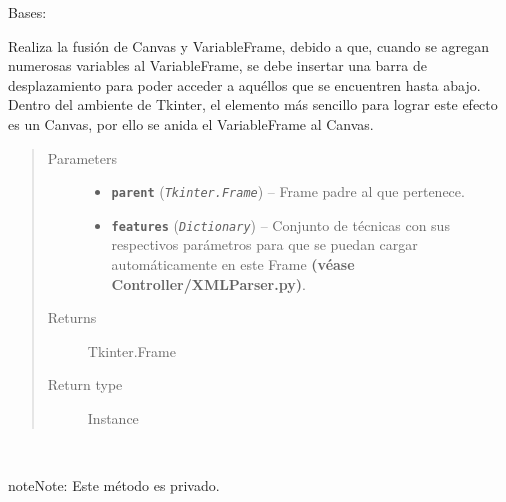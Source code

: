 \documentclass[letterpaper,10pt,english]{sphinxmanual}
\begin{document}
\begin{fulllineitems}
\label{View/Main/DecisionVariable/DecisionVariableFrame:View.Main.DecisionVariable.DecisionVariableFrame.DecisionVariableFrame}
Bases: 

\begin{DUlineblock}{0em}
\item[] Realiza la fusión de Canvas y VariableFrame, debido a que, cuando se agregan 
numerosas variables al VariableFrame, se debe insertar una barra de desplazamiento
para poder acceder a aquéllos que se encuentren hasta abajo. Dentro del ambiente
de Tkinter, el elemento más sencillo para lograr este efecto es un Canvas, por ello 
se anida el VariableFrame al Canvas.
\end{DUlineblock}
\begin{quote}\begin{description}
\item[{Parameters}] \leavevmode\begin{itemize}
\item {} 
\textbf{\texttt{parent}} (\emph{\texttt{Tkinter.Frame}}) -- Frame padre al que pertenece.

\item {} 
\textbf{\texttt{features}} (\emph{\texttt{Dictionary}}) -- Conjunto de técnicas con sus respectivos parámetros para que
se puedan cargar automáticamente en este Frame \textbf{(véase
Controller/XMLParser.py)}.

\end{itemize}

\item[{Returns}] \leavevmode
Tkinter.Frame

\item[{Return type}] \leavevmode
Instance

\end{description}\end{quote}

\begin{fulllineitems}
\label{View/Main/DecisionVariable/DecisionVariableFrame:View.Main.DecisionVariable.DecisionVariableFrame.DecisionVariableFrame._DecisionVariableFrame__activate_scroll}~
\begin{notice}{note}{Note:}
Este método es privado.
\end{notice}


\end{fulllineitems}
\end{fulllineitems}
\end{document}
